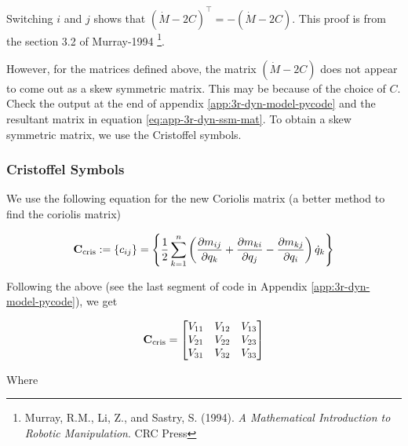 Switching $i$ and $j$ shows that $\left ( \dot{M} - 2C \right )^\top = -\left ( \dot{M} - 2C \right )$. This proof is from the section 3.2 of Murray-1994 \footnote{Murray, R.M., Li, Z., and Sastry, S. (1994). \textit{A Mathematical
Introduction to Robotic Manipulation}. CRC Press}.

However, for the matrices defined above, the matrix $\left ( \dot{M} - 2C \right )$ does not appear to come out as a skew symmetric matrix. This may be because of the choice of $C$. Check the output at the end of appendix \ref{app:3r-dyn-model-pycode} and the resultant matrix in equation \ref{eq:app-3r-dyn-ssm-mat}. To obtain a skew symmetric matrix, we use the Cristoffel symbols.

\subsubsection*{Cristoffel Symbols}

We use the following equation for the new Coriolis matrix (a better method to find the coriolis matrix)

\begin{equation}
    \mathbf{C}_{\textup{cris}} := \left \{ c_{ij} \right \} = \left \{ \frac{1}{2} \sum_{k=1}^{n} \left ( \frac{\partial m_{ij}}{\partial q_k} + \frac{\partial m_{ki}}{\partial q_j} - \frac{\partial m_{kj}}{\partial q_i}\right ) \dot{q}_k \right \}
\end{equation}


Following the above (see the last segment of code in Appendix \ref{app:3r-dyn-model-pycode}), we get

\begin{align}
    \mathbf{C}_{\textup{cris}} = \begin{bmatrix}
        V_{11} & V_{12} & V_{13} \\
        V_{21} & V_{22} & V_{23} \\
        V_{31} & V_{32} & V_{33}
        \end{bmatrix}
    \label{eq:3r-dyn-cc-cris-matrix}
\end{align}

Where

